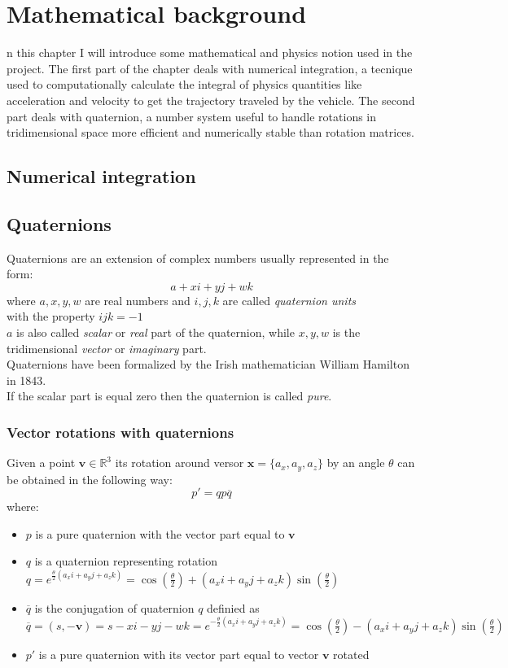 \chapter{Mathematical background}
\label{chap:math_background}

n this chapter I will introduce some mathematical and physics notion used in the project.
The first part of the chapter deals with numerical integration, a tecnique used to computationally calculate the integral of physics quantities like acceleration and velocity to get the trajectory traveled by the vehicle.
The second part deals with quaternion, a number system useful to handle rotations in tridimensional space more efficient and numerically stable than rotation matrices.

\section{Numerical integration}

\section{Quaternions}
Quaternions are an extension of complex numbers usually represented in the form:
$$ a + xi + yj + wk $$
where $a, x, y, w$ are real numbers and $i, j, k$ are called \textit{quaternion units} \\
with the property ${ijk=-1}$  \\
$a$ is also called \textit{scalar} or \textit{real} part of the quaternion, while $x,y,w$ is the tridimensional \textit{vector} or \textit{imaginary} part. \cite{amslaurea6701} \\
Quaternions have been formalized by the Irish mathematician William Hamilton in 1843. \\
If the scalar part is equal zero then the quaternion is called \textit{pure}.

\subsection{Vector rotations with quaternions}
Given a point $\boldsymbol{v} \in \mathbb{R}^3$ its rotation around versor $\boldsymbol{x}=\{a_x, a_y, a_z\}$ by an angle $\theta$ can be obtained in the following way:
$$ p' = q p \overline{q}$$
where: \\
\begin{itemize}
\item $p$ is a pure quaternion with the vector part equal to $\boldsymbol{v}$
\item $q$ is a quaternion representing rotation $q=e^{\frac{\theta}{2}(a_x i + a_y j + a_z k)}=\cos(\frac{\theta}{2})+(a_x i + a_y j + a_z k)\sin(\frac{\theta}{2})$ 
\item $\overline{q}$ is the conjugation of quaternion $q$ definied as \\
$\overline{q}=(s,-\boldsymbol{v})=s-xi-yj-wk=e^{-\frac{\theta}{2}(a_x i + a_y j + a_z k)}=\cos(\frac{\theta}{2})-(a_x i + a_y j + a_z k)\sin(\frac{\theta}{2})$
\item $p'$ is a pure quaternion with its vector part equal to vector $\boldsymbol{v}$ rotated
\end{itemize}


